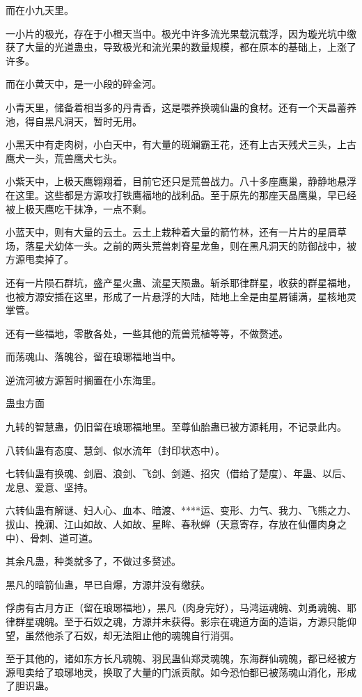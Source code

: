 \begin{this_body}
而在小九天里。

一小片的极光，存在于小橙天当中。极光中许多流光果载沉载浮，因为璇光坑中缴获了大量的光道蛊虫，导致极光和流光果的数量规模，都在原本的基础上，上涨了许多。

而在小黄天中，是一小段的碎金河。

小青天里，储备着相当多的丹青香，这是喂养换魂仙蛊的食材。还有一个天晶蓄养池，得自黑凡洞天，暂时无用。

小黑天中有走肉树，小白天中，有大量的斑斓霸王花，还有上古天残犬三头，上古鹰犬一头，荒兽鹰犬七头。

小紫天中，上极天鹰翱翔着，目前它还只是荒兽战力。八十多座鹰巢，静静地悬浮在这里。这些都是方源攻打铁鹰福地的战利品。至于原先的那座天晶鹰巢，早已经被上极天鹰吃干抹净，一点不剩。

小蓝天中，则有大量的云土。云土上栽种着大量的箭竹林，还有一片片的星屑草场，落星犬幼体一头。之前的两头荒兽刺脊星龙鱼，则在黑凡洞天的防御战中，被方源甩卖掉了。

还有一片陨石群坑，盛产星火蛊、流星天陨蛊。斩杀耶律群星，收获的群星福地，也被方源安插在这里，形成了一片悬浮的大陆，陆地上全是由星屑铺满，星核地灵掌管。

还有一些福地，零散各处，一些其他的荒兽荒植等等，不做赘述。

而荡魂山、落魄谷，留在琅琊福地当中。

逆流河被方源暂时搁置在小东海里。

蛊虫方面

九转的智慧蛊，仍旧留在琅琊福地里。至尊仙胎蛊已被方源耗用，不记录此内。

八转仙蛊有态度、慧剑、似水流年（封印状态中）。

七转仙蛊有换魂、剑眉、浪剑、飞剑、剑遁、招灾（借给了楚度）、年蛊、以后、龙息、爱意、坚持。

六转仙蛊有解谜、妇人心、血本、暗渡、****运、变形、力气、我力、飞熊之力、拔山、挽澜、江山如故、人如故、星眸、春秋蝉（天意寄存，存放在仙僵肉身之中）、骨刺、道可道。

其余凡蛊，种类就多了，不做过多赘述。

黑凡的暗箭仙蛊，早已自爆，方源并没有缴获。

俘虏有古月方正（留在琅琊福地），黑凡（肉身完好），马鸿运魂魄、刘勇魂魄、耶律群星魂魄。至于石奴之魂，方源并未获得。影宗在魂道方面的造诣，方源只能仰望，虽然他杀了石奴，却无法阻止他的魂魄自行消弭。

至于其他的，诸如东方长凡魂魄、羽民蛊仙郑灵魂魄，东海群仙魂魄，都已经被方源甩卖给了琅琊地灵，换取了大量的门派贡献。如今恐怕都已被荡魂山消化，形成了胆识蛊。


\end{this_body}
